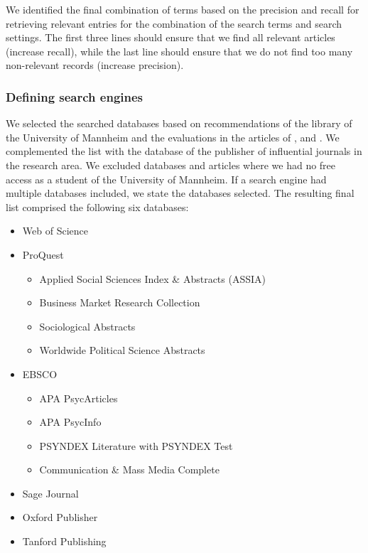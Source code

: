 We identified the final combination of terms based on the precision and recall for retrieving relevant entries for the combination of the search terms and search settings. The first three lines should ensure that we find all relevant articles (increase recall), while the last line should ensure that we do not find too many non-relevant records (increase precision).


\subsubsection{Defining search engines}
\label{subsubsec: Defining search engines}

We selected the searched databases based on recommendations of the library of the University of Mannheim and the evaluations in the articles of \cite{pascoe_systematic_2021}, \cite{papaioannou_literature_2010} and \cite{gusenbauer_which_2020}. We complemented the list with the database of the publisher of influential journals in the research area. We excluded databases and articles where we had no free access as a student of the University of Mannheim. If a search engine had multiple databases included, we state the databases selected. The resulting final list comprised the following six databases:

\begin{itemize}
    \item  Web of Science
    \item ProQuest
    \begin{itemize}
        \item Applied Social Sciences Index \& Abstracts (ASSIA)
        \item Business Market Research Collection
        \item Sociological Abstracts
        \item Worldwide Political Science Abstracts
    \end{itemize}
    \item EBSCO
    \begin{itemize}
        \item APA PsycArticles
        \item APA PsycInfo
        \item PSYNDEX Literature with PSYNDEX Test
        \item Communication \& Mass Media Complete
    \end{itemize}
    \item Sage Journal
    \item Oxford Publisher
    \item Tanford Publishing
\end{itemize}

